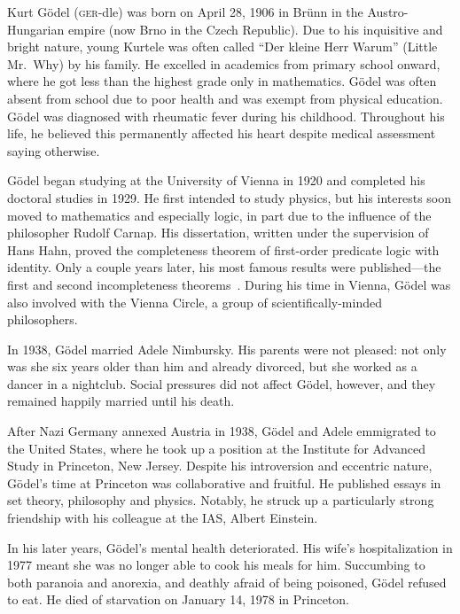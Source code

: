 \documentclass[../../../include/open-logic-section]{subfiles}
\begin{document}



Kurt G{\"o}del (\textsc{ger}-dle) was born on April 28, 1906 in
Br{\"u}nn in the Austro-Hungarian empire (now Brno in the Czech
Republic). Due to his inquisitive and bright nature, young Kurtele was
often called ``Der kleine Herr Warum'' (Little Mr.~Why) by his
family. He excelled in academics from primary school onward, where he
got less than the highest grade only in mathematics. G{\"o}del was
often absent from school due to poor health and was exempt from
physical education. G{\"o}del was diagnosed with rheumatic fever
during his childhood. Throughout his life, he believed this
permanently affected his heart despite medical assessment saying
otherwise.

G{\"o}del began studying at the University of Vienna in 1920 and
completed his doctoral studies in 1929. He first intended to study
physics, but his interests soon moved to mathematics and especially
logic, in part due to the influence of the philosopher Rudolf
Carnap. His dissertation, written under the supervision of Hans Hahn,
proved the completeness theorem of first-order predicate logic with
identity. Only a couple years later, his most famous results were
published---the first and second incompleteness
theorems~\citep{Godel1931}. During his time in Vienna, G{\"o}del was
also involved with the Vienna Circle, a group of scientifically-minded
philosophers.

In 1938, G\"odel married Adele Nimbursky. His parents were not
pleased: not only was she six years older than him and already
divorced, but she worked as a dancer in a nightclub. 
Social pressures did not affect G{\"o}del, however,
and they remained happily married until his death.

After Nazi Germany annexed Austria in 1938, G{\"o}del and Adele
emmigrated to the United States, where he took up a position at the
Institute for Advanced Study in Princeton, New Jersey. Despite his
introversion and eccentric nature, G{\"o}del's time at Princeton was
collaborative and fruitful.  He published essays in set theory,
philosophy and physics. Notably, he struck up a particularly strong
friendship with his colleague at the IAS, Albert Einstein.

In his later years, G{\"o}del's mental health deteriorated. His wife's
hospitalization in 1977 meant she was no longer able to cook his meals
for him. Succumbing to both paranoia and anorexia, and deathly afraid
of being poisoned, G{\"o}del refused to eat. He died of starvation on
January 14, 1978 in Princeton.
\end{document}
